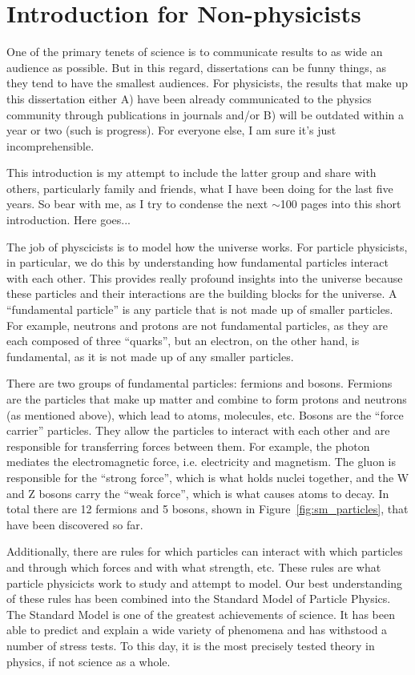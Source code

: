 \chapter{Introduction for Non-physicists}

One of the primary tenets of science is to communicate results to as wide an audience as possible.
But in this regard, dissertations can be funny things, as they tend to have the smallest audiences.
For physicists, the results that make up this dissertation either A) have been already communicated to the physics community through publications in journals and/or B) will be outdated within a year or two (such is progress).
For everyone else, I am sure it's just incomprehensible.

This introduction is my attempt to include the latter group and share with others, particularly family and friends, what I have been doing for the last five years.
So bear with me, as I try to condense the next $\sim$100 pages into this short introduction.
Here goes...

The job of physcicists is to model how the universe works.
For particle physicists, in particular, we do this by understanding how fundamental particles interact with each other.
This provides really profound insights into the universe because these particles and their interactions are the building blocks for the universe.
A ``fundamental particle'' is any particle that is not made up of smaller particles.
For example, neutrons and protons are not fundamental particles, as they are each composed of three ``quarks'', but an electron, on the other hand, is fundamental, as it is not made up of any smaller particles. 

There are two groups of fundamental particles: fermions and bosons.
Fermions are the particles that make up matter and combine to form protons and neutrons (as mentioned above), which lead to atoms, molecules, etc.
Bosons are the ``force carrier'' particles.
They allow the particles to interact with each other and are responsible for transferring forces between them.
For example, the photon mediates the electromagnetic force, i.e. electricity and magnetism.
The gluon is responsible for the ``strong force'', which is what holds nuclei together, and the W and Z bosons carry the ``weak force'', which is what causes atoms to decay.
In total there are 12 fermions and 5 bosons, shown in Figure~\ref{fig:sm_particles}, that have been discovered so far.

Additionally, there are rules for which particles can interact with which particles and through which forces and with what strength, etc.
These rules are what particle physicicts work to study and attempt to model.
Our best understanding of these rules has been combined into the Standard Model of Particle Physics.
The Standard Model is one of the greatest achievements of science.
It has been able to predict and explain a wide variety of phenomena and has withstood a number of stress tests.
To this day, it is the most precisely tested theory in physics, if not science as a whole.

